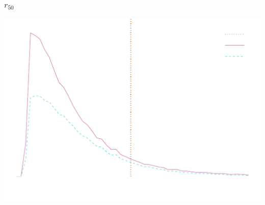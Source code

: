 \documentclass{beamer}
\begin{document}
\frame
{
    \frametitle{$r_{50}$}
 
    \begin{center}
        \includegraphics[width=\textwidth]{run-bdj03mcal01-r50-inv.pdf}
        \newline
    \end{center}



}
\end{document}
